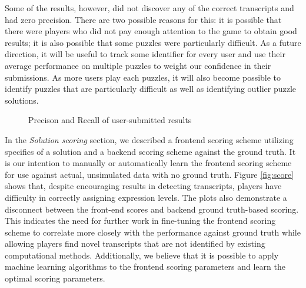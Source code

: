 \documentclass[12pt]{article}
\begin{document}
Some of the results, however, did not discover any of the correct transcripts and had zero precision. There are two possible reasons for this: it is possible that there were players who did not pay enough attention to the game to obtain good results; it is also possible that some puzzles were particularly difficult. As a future direction, it will be useful to track some identifier for every user and use their average performance on multiple puzzles to weight our confidence in their submissions. As more users play each puzzles, it will also become possible to identify puzzles that are particularly difficult as well as identifying outlier puzzle solutions.

\begin{figure}[H]
\centering
{} 
\caption{Precison and Recall of user-submitted results}\label{fig:precisionandrecall}
\end{figure}

In the \emph{Solution scoring} section, we described a frontend scoring scheme utilizing specifics of a solution and a backend scoring scheme against the ground truth. It is our intention to manually or automatically learn the frontend scoring scheme for use against actual, unsimulated data with no ground truth. Figure \ref{fig:score} shows that, despite encouraging results in detecting transcripts, players have difficulty in correctly assigning expression levels. The plots also demonstrate a disconnect between the front-end scores and backend ground truth-based scoring. This indicates the need for further work in fine-tuning the frontend scoring scheme to correlate more closely with the performance against ground truth while allowing players find novel transcripts that are not
identified by existing computational methods. Additionally, we believe that it is possible to apply machine learning algorithms to the frontend scoring parameters and learn the optimal scoring parameters.
\end{document}
